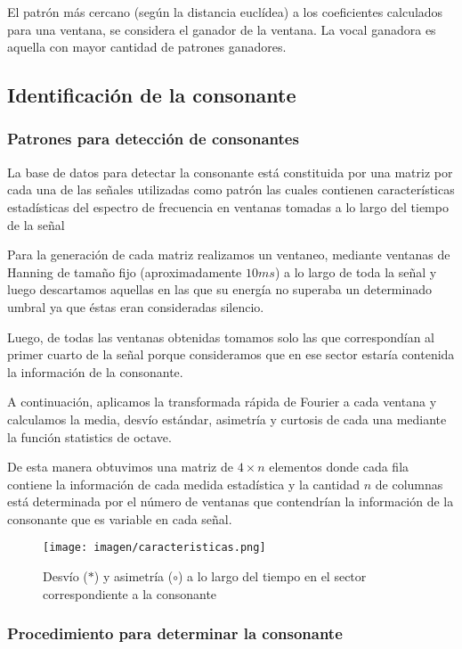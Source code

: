 \documentclass[conference,a4paper,10pt,oneside,final]{tfmpd}
\begin{document}
		El patrón más cercano (según la distancia euclídea) a los coeficientes
		calculados para una ventana, se considera el ganador de la ventana.
		La vocal ganadora es aquella con mayor cantidad de patrones ganadores.

	\subsection{Identificación de la consonante}
	\subsubsection{Patrones para detección de consonantes}

		La base de datos para detectar la consonante está constituida por una
		matriz por cada una de las señales utilizadas como patrón las cuales
		contienen características estadísticas del espectro de frecuencia en
		ventanas tomadas a lo largo del tiempo de la señal %

		Para la  generación de cada matriz realizamos un ventaneo, mediante
		ventanas de Hanning de tamaño fijo (aproximadamente $10 ms$) a lo largo
		de toda la señal y luego descartamos aquellas en las que su energía no
		superaba un determinado umbral ya que éstas eran consideradas silencio.

		Luego, de todas las ventanas obtenidas tomamos solo las que correspondían
		al primer cuarto de la señal porque consideramos que en ese sector
		estaría contenida la información de la consonante.

		A continuación, aplicamos la transformada rápida de Fourier a cada
		ventana y calculamos la media, desvío estándar, asimetría y curtosis
		de cada una mediante la función statistics de octave.

		De esta manera obtuvimos una matriz de $4 \times n$ elementos donde cada fila
		contiene la información de cada medida estadística y la cantidad $n$
		de columnas está determinada por el número de ventanas que contendrían
		la información de la consonante que es variable en cada señal.

		
		\begin{figure}
			\texttt{[image: imagen/caracteristicas.png]}
			\caption{
				Desvío ($*$) y asimetría ($\circ$) a lo largo del tiempo
				en el sector correspondiente a la consonante
			}
			\label{fig:tracto}
		\end{figure}


	\subsubsection{Procedimiento para determinar la consonante}
\end{document}
